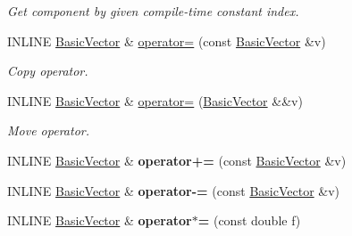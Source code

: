 \begin{DoxyCompactItemize}
\begin{DoxyCompactList}\small\item\em Get component by given compile-\/time constant index. \end{DoxyCompactList}\item 
\hypertarget{classBasicVector_3_01double_01_4_a11157f9400a7706ec87a967892019359}{}\label{classBasicVector_3_01double_01_4_a11157f9400a7706ec87a967892019359} 
I\+N\+L\+I\+NE \hyperlink{classBasicVector}{Basic\+Vector} \& \hyperlink{classBasicVector_3_01double_01_4_a11157f9400a7706ec87a967892019359}{operator=} (const \hyperlink{classBasicVector}{Basic\+Vector} \&v)
\begin{DoxyCompactList}\small\item\em Copy operator. \end{DoxyCompactList}\item 
\hypertarget{classBasicVector_3_01double_01_4_ace68123af6c89d86318d13683e5f4eea}{}\label{classBasicVector_3_01double_01_4_ace68123af6c89d86318d13683e5f4eea} 
I\+N\+L\+I\+NE \hyperlink{classBasicVector}{Basic\+Vector} \& \hyperlink{classBasicVector_3_01double_01_4_ace68123af6c89d86318d13683e5f4eea}{operator=} (\hyperlink{classBasicVector}{Basic\+Vector} \&\&v)
\begin{DoxyCompactList}\small\item\em Move operator. \end{DoxyCompactList}\item 
\hypertarget{classBasicVector_3_01double_01_4_a01a354b7eaf0142a7f41794d407dd6ae}{}\label{classBasicVector_3_01double_01_4_a01a354b7eaf0142a7f41794d407dd6ae} 
I\+N\+L\+I\+NE \hyperlink{classBasicVector}{Basic\+Vector} \& {\bfseries operator+=} (const \hyperlink{classBasicVector}{Basic\+Vector} \&v)
\item 
\hypertarget{classBasicVector_3_01double_01_4_acebdc955cc10f605ca85be4cc725bb79}{}\label{classBasicVector_3_01double_01_4_acebdc955cc10f605ca85be4cc725bb79} 
I\+N\+L\+I\+NE \hyperlink{classBasicVector}{Basic\+Vector} \& {\bfseries operator-\/=} (const \hyperlink{classBasicVector}{Basic\+Vector} \&v)
\item 
\hypertarget{classBasicVector_3_01double_01_4_a19abfac47ea052e2f00f8da97c9053c7}{}\label{classBasicVector_3_01double_01_4_a19abfac47ea052e2f00f8da97c9053c7} 
I\+N\+L\+I\+NE \hyperlink{classBasicVector}{Basic\+Vector} \& {\bfseries operator$\ast$=} (const double f)
\item 
\hypertarget{classBasicVector_3_01double_01_4_ac509c2608313557664c8a8690ffe1384}{}\label{classBasicVector_3_01double_01_4_ac509c2608313557664c8a8690ffe1384} 

\end{DoxyCompactItemize}
